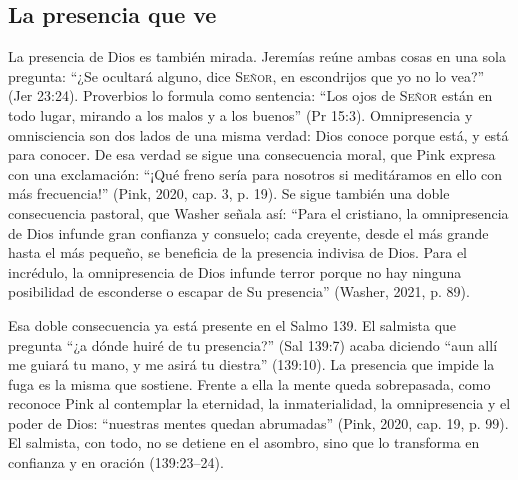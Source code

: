 \documentclass[11pt,letterpaper]{article}
\newcommand{\SENOR}{\textsc{Señor}}
\begin{document}
\subsection{La presencia que ve}

La presencia de Dios es también mirada. Jeremías reúne ambas cosas en una sola pregunta: ``¿Se ocultará alguno, dice \SENOR{}, en escondrijos que yo no lo vea?'' (Jer 23:24). Proverbios lo formula como sentencia: ``Los ojos de \SENOR{} están en todo lugar, mirando a los malos y a los buenos'' (Pr 15:3). Omnipresencia y omnisciencia son dos lados de una misma verdad: Dios conoce porque está, y está para conocer. De esa verdad se sigue una consecuencia moral, que Pink expresa con una exclamación: ``¡Qué freno sería para nosotros si meditáramos en ello con más frecuencia!'' (Pink, 2020, cap. 3, p. 19). Se sigue también una doble consecuencia pastoral, que Washer señala así: ``Para el cristiano, la omnipresencia de Dios infunde gran confianza y consuelo; cada creyente, desde el más grande hasta el más pequeño, se beneficia de la presencia indivisa de Dios. Para el incrédulo, la omnipresencia de Dios infunde terror porque no hay ninguna posibilidad de esconderse o escapar de Su presencia'' (Washer, 2021, p. 89).

Esa doble consecuencia ya está presente en el Salmo 139. El salmista que pregunta ``¿a dónde huiré de tu presencia?'' (Sal 139:7) acaba diciendo ``aun allí me guiará tu mano, y me asirá tu diestra'' (139:10). La presencia que impide la fuga es la misma que sostiene. Frente a ella la mente queda sobrepasada, como reconoce Pink al contemplar la eternidad, la inmaterialidad, la omnipresencia y el poder de Dios: ``nuestras mentes quedan abrumadas'' (Pink, 2020, cap. 19, p. 99). El salmista, con todo, no se detiene en el asombro, sino que lo transforma en confianza y en oración (139:23--24).
\end{document}
